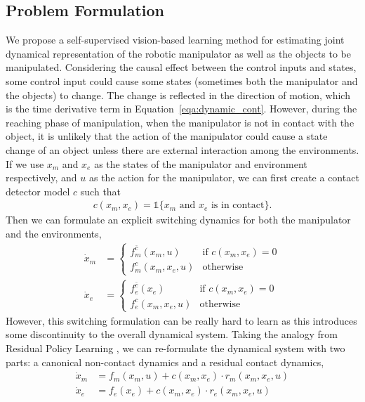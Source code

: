 \documentclass[conference]{IEEEtran}
\begin{document}
\subsection{Problem Formulation}
We propose a self-supervised vision-based learning method for estimating joint
dynamical representation of the robotic manipulator as well as the objects to be manipulated.
Considering the causal effect between the control inputs and states, some control input
could cause some states (sometimes both the manipulator and the objects) to change.
The change is reflected in the direction of motion, which is the time derivative
term in Equation~\ref{eqa:dynamic_cont}. However, during the reaching phase of
manipulation, when the manipulator is not in contact with the object, it is
unlikely that the action of the manipulator could cause a state change of an
object unless there are external interaction among the environments. If
we use $x_m$ and $x_e$ as the states of the manipulator and environment
respectively, and $u$ as the action for the manipulator, we can first
create a contact detector model $c$ such that
\begin{gather}
  c(x_m, x_e) = \mathds{1}\{\text{$x_m$ and $x_e$ is in contact}\}.
\end{gather}
Then we can formulate an explicit switching dynamics for both the manipulator
and the environments,
\begin{equation}
  \begin{aligned}
    \dot{x}_m &= \begin{cases}
      f_m^{\bar{c}}(x_m, u) & \text{if $c(x_m, x_e) = 0$} \\
      f_m^c(x_m, x_e, u) & \text{otherwise}
    \end{cases}\\
    \dot{x}_e &= \begin{cases}
      f_e^{\bar{c}}(x_e) & \text{if $c(x_m, x_e) = 0$} \\
      f_e^c(x_m, x_e, u) & \text{otherwise}
    \end{cases}
  \end{aligned}
\end{equation}
However, this switching formulation can be really hard to learn as this
introduces some discontinuity to the overall dynamical system. Taking the
analogy from Residual Policy Learning \cite{residual_policy}, we can re-formulate
the dynamical system with two parts: a canonical non-contact dynamics and a
residual contact dynamics,
\begin{equation}\label{eqa:soft_dyn}
  \begin{aligned}
    \dot{x}_m &= f_m(x_m, u) + c(x_m, x_e) \cdot r_m(x_m, x_e, u) \\
    \dot{x}_e &= f_e(x_e) + c(x_m, x_e) \cdot r_e(x_m, x_e, u)
  \end{aligned}
\end{equation}
\end{document}

